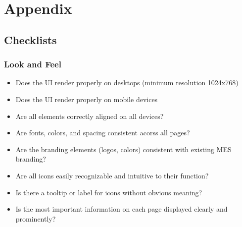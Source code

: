 \documentclass[12pt, titlepage]{article}
\begin{document}

\newpage

\section{Appendix}

\subsection{Checklists}


\hypertarget{checklist-nfr10}{}
\subsubsection{Look and Feel}

  \begin{itemize}[label=$\square$] %
    \item Does the UI render properly on desktops (minimum resolution 1024x768) 
    \item Does the UI render properly on mobile devices 
    \item Are all elements correctly aligned on all devices? 
    \item Are fonts, colors, and spacing consistent acorss all pages?
    \item Are the branding elements (logos, colors) consistent with existing MES branding?
    \item Are all icons easily recognizable and intuitive to their function?
    \item Is there a tooltip or label for icons without obvious meaning?
    \item Is the most important information on each page displayed clearly and prominently?
 \end{itemize}

\hypertarget{checklist-nfr11}{}
\end{document}
